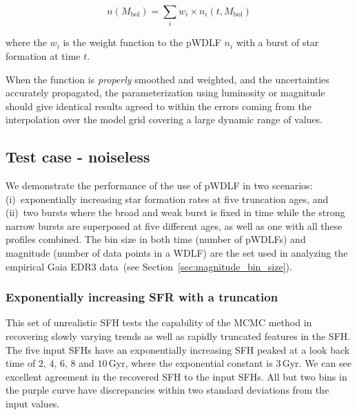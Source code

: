 \documentclass[fleqn,usenatbib]{mnras}
\begin{document}
\begin{equation}
    n(M_\mathrm{bol}) = \sum_i w_i \times n_i(t, M_\mathrm{bol})    
\end{equation}

where the $w_i$ is the weight function to the pWDLF $n_i$ with a burst of star
formation at time $t$.

When the function is \textit{properly} smoothed and weighted, and the
uncertainties accurately propagated, the parameterization using luminosity or
magnitude should give identical results agreed to within the errors coming from
the interpolation over the model grid covering a large dynamic range of values.

\subsection{Test case - noiseless}

We demonstrate the performance of the use of pWDLF in two scenarios:
(i)~exponentially increasing star formation rates at five truncation ages, and
(ii)~two bursts where the broad and weak burst is fixed in time while the strong
narrow bursts are superposed at five different ages, as well as one with all
these profiles combined. The bin size in both time (number of pWDLFs) and
magnitude (number of data points in a WDLF) are the set used in analyzing the
empirical Gaia EDR3 data~(see Section~\ref{sec:magnitude_bin_size}).

\subsubsection*{Exponentially increasing SFR with a truncation}
This set of unrealistic SFH tests the capability of the MCMC method in
recovering slowly varying trends as well as rapidly truncated features in the
SFH. The five input SFHs have an exponentially increasing SFH peaked at a look
back time of $2$, $4$, $6$, $8$ and $10$\,Gyr, where the exponential constant
is $3$\,Gyr. We can see excellent agreement in the recovered SFH to the input
SFHs. All but two bins in the purple curve have discrepancies within two
standard deviations from the input values. 
\end{document}
